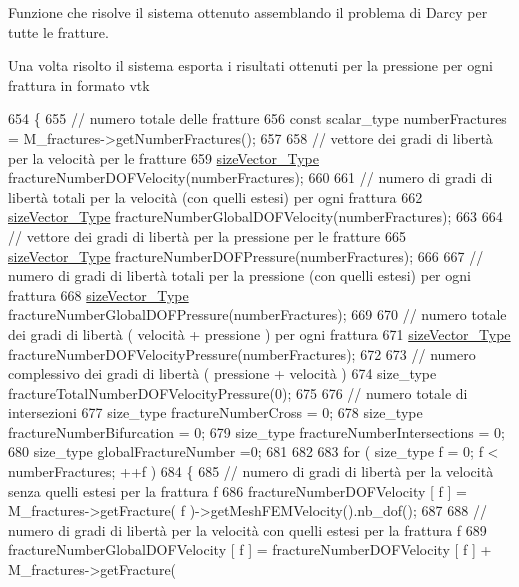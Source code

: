 Funzione che risolve il sistema ottenuto assemblando il problema di Darcy per tutte le fratture. 

Una volta risolto il sistema esporta i risultati ottenuti per la pressione per ogni frattura in formato vtk 
\begin{DoxyCode}
654 \{  
655     \textcolor{comment}{// numero totale delle fratture}
656     \textcolor{keyword}{const} scalar\_type numberFractures = M\_fractures->getNumberFractures();
657    
658     \textcolor{comment}{// vettore dei gradi di libertà per la velocità per le fratture}
659     \hyperlink{Core_8h_a83c51913d041a5001e8683434c09857f}{sizeVector\_Type} fractureNumberDOFVelocity(numberFractures);
660     
661     \textcolor{comment}{// numero di gradi di libertà totali per la velocità (con quelli estesi) per ogni frattura }
662     \hyperlink{Core_8h_a83c51913d041a5001e8683434c09857f}{sizeVector\_Type} fractureNumberGlobalDOFVelocity(numberFractures);
663 
664     \textcolor{comment}{// vettore dei gradi di libertà per la pressione per le fratture}
665     \hyperlink{Core_8h_a83c51913d041a5001e8683434c09857f}{sizeVector\_Type} fractureNumberDOFPressure(numberFractures);
666     
667     \textcolor{comment}{// numero di gradi di libertà totali per la pressione (con quelli estesi) per ogni frattura }
668     \hyperlink{Core_8h_a83c51913d041a5001e8683434c09857f}{sizeVector\_Type} fractureNumberGlobalDOFPressure(numberFractures);
669 
670     \textcolor{comment}{// numero totale dei gradi di libertà ( velocità + pressione ) per ogni frattura}
671     \hyperlink{Core_8h_a83c51913d041a5001e8683434c09857f}{sizeVector\_Type} fractureNumberDOFVelocityPressure(numberFractures);
672 
673     \textcolor{comment}{// numero complessivo dei gradi di libertà ( pressione + velocità ) }
674     size\_type fractureTotalNumberDOFVelocityPressure(0);
675 
676     \textcolor{comment}{// numero totale di intersezioni}
677     size\_type fractureNumberCross = 0;
678     size\_type fractureNumberBifurcation = 0;
679     size\_type fractureNumberIntersections = 0;
680     size\_type globalFractureNumber =0;
681 
682     
683     \textcolor{keywordflow}{for} ( size\_type f = 0; f < numberFractures; ++f )
684     \{
685         \textcolor{comment}{// numero di gradi di libertà per la velocità senza quelli estesi per la frattura f}
686         fractureNumberDOFVelocity [ f ] = M\_fractures->getFracture( f )->getMeshFEMVelocity().nb\_dof();
687 
688         \textcolor{comment}{// numero di gradi di libertà per la velocità con quelli estesi per la frattura f}
689         fractureNumberGlobalDOFVelocity [ f ] = fractureNumberDOFVelocity [ f ] + M\_fractures->getFracture(

\end{DoxyCode}

